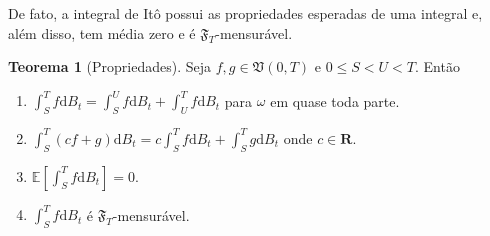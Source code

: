 \documentclass[12pt,a4paper]{article}
\theoremstyle{definition}
\newtheorem{theorem}{Teorema}
\begin{document}
De fato, a integral de Itô possui as propriedades esperadas de uma integral e, além disso, tem média zero e é $\mathfrak{F}_T$-mensurável.

\begin{theorem}[Propriedades]
	Seja $f, g \in \mathfrak{V}(0,T)$ e $0 \leq S < U < T$. Então
	\begin{enumerate}
		\item $\int_S^T f \mathrm{d}B_t = \int_S^U f \mathrm{d}B_t + \int_U^T f \mathrm{d}B_t$ para $\omega$ em quase toda parte.
		\item $\int_S^T (cf + g) \mathrm{d}B_t = c \int_S^T f \mathrm{d}B_t + \int_S^T g \mathrm{d}B_t$ onde $c \in \textbf{R}$.
		\item $\mathbb{E} \left[ \int_S^T f \mathrm{d}B_t \right] = 0$.
		\item $\int_S^T f \mathrm{d}B_t$ é $\mathfrak{F}_T$-mensurável.
	\end{enumerate}
\end{theorem}
\end{document}
